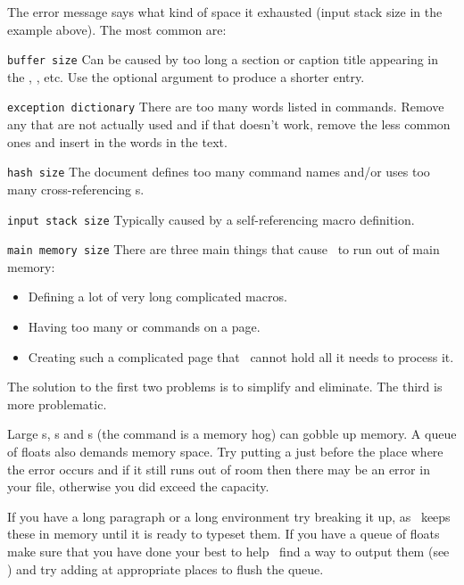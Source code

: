     The error message says what kind of space it exhausted (input stack size
in the example above). The most common are:
\begin{plainlist}

\item[\texttt{buffer size}\index{buffer size}] 
   Can be caused by too long a section or caption title appearing
   in the \toc, \lof, etc. Use the optional argument to produce a 
   shorter entry.

\item[\texttt{exception dictionary}\index{exception dictionary}] There
    are too many words listed in \cmd{\hyphenation} commands. Remove any 
    that are not actually used and if that doesn't work, remove the less 
    common ones and insert \cmd{\-} in the words in the text.

\item[\texttt{hash size}\index{hash size}]
    The document defines too many command names and/or uses too many
    cross-referencing \cmd{\label}s.

\item[\texttt{input stack size}\index{input stack size}]
    Typically caused by a self-referencing macro definition.


\item[\texttt{main memory size}\index{main memory size}]
    There are three main things that  cause \tx\ to run out of main memory:
\begin{itemize}
\item Defining a lot of very long complicated macros.
\item Having too many \cmd{\index} or \cmd{\glossary} commands on a page.
\item Creating such a complicated page that \tx\ cannot hold all it needs
      to process it.
\end{itemize}
The solution to the first two problems is to simplify and eliminate. The
third is more problematic.

    Large s, s and s (the \cmd{\qbezier}
command is a memory hog) can gobble up memory. A queue of floats also demands
memory space. Try putting a \cmd{\clearpage} just before the place where the
error occurs and if it still runs out of room then there may be an error in
your file, otherwise you did exceed the capacity.

    If you have a long paragraph or a long  environment try
breaking it up, as \tx\ keeps these in memory until it is ready to 
typeset them. If you have a queue of floats make sure that you have done
your best to help \ltx\ find a way to output them (see )
and try adding \cmd{\clearpage} at appropriate places to flush the queue.



\end{plainlist}
